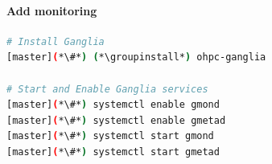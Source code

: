 \documentclass[letterpaper]{article}
\newcommand{\groupinstall}{yum -y groupinstall}
\begin{document}
\paragraph{Add \Ganglia{} monitoring}



\begin{lstlisting}[language=bash,keywords={},upquote=true]
# Install Ganglia
[master](*\#*) (*\groupinstall*) ohpc-ganglia

# Start and Enable Ganglia services
[master](*\#*) systemctl enable gmond
[master](*\#*) systemctl enable gmetad
[master](*\#*) systemctl start gmond
[master](*\#*) systemctl start gmetad
\end{lstlisting}

\end{document}
